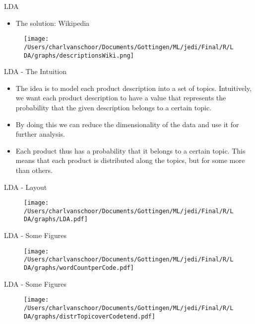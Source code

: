 \documentclass{beamer}
\begin{document}
\begin{frame}{LDA}

\begin{itemize}
\item The solution: Wikipedia 
\end{itemize}

\begin{figure}
\texttt{[image: /Users/charlvanschoor/Documents/Gottingen/ML/jedi/Final/R/LDA/graphs/descriptionsWiki.png]}
\end{figure}

\end{frame}


\begin{frame}{LDA - The Intuition}

\begin{itemize}
\item The idea is to model each product description into a set of topics. Intuitively, we want each product description to have a value that represents the probability that the given description belongs to a certain topic. 
\item By doing this we can reduce the dimensionality of the data and use it for further analysis. 
\item Each product thus has a probability that it belongs to a certain topic. This means that each product is distributed along the topics, but for some more than others.
\end{itemize}

\end{frame}



\begin{frame}{LDA - Layout}
\begin{figure}
\texttt{[image: /Users/charlvanschoor/Documents/Gottingen/ML/jedi/Final/R/LDA/graphs/LDA.pdf]}
\end{figure}
\end{frame}



\begin{frame}{LDA - Some Figures}

\begin{figure}
\texttt{[image: /Users/charlvanschoor/Documents/Gottingen/ML/jedi/Final/R/LDA/graphs/wordCountperCode.pdf]}
\end{figure}
\end{frame}

\begin{frame}{LDA - Some Figures}

\begin{figure}
\texttt{[image: /Users/charlvanschoor/Documents/Gottingen/ML/jedi/Final/R/LDA/graphs/distrTopicoverCodetend.pdf]}
\end{figure}

\end{frame}
\end{document}
